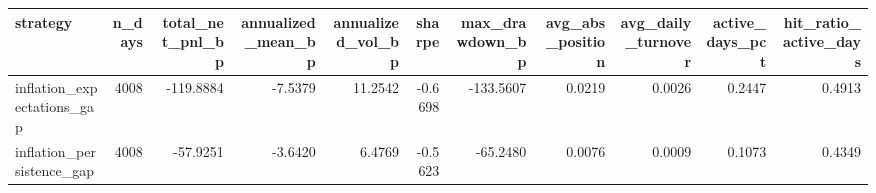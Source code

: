 \begin{tabular}{lrrrrrrrrrr}
\toprule
strategy & n_days & total_net_pnl_bp & annualized_mean_bp & annualized_vol_bp & sharpe & max_drawdown_bp & avg_abs_position & avg_daily_turnover & active_days_pct & hit_ratio_active_days \\
\midrule
inflation_expectations_gap & 4008 & -119.8884 & -7.5379 & 11.2542 & -0.6698 & -133.5607 & 0.0219 & 0.0026 & 0.2447 & 0.4913 \\
inflation_persistence_gap & 4008 & -57.9251 & -3.6420 & 6.4769 & -0.5623 & -65.2480 & 0.0076 & 0.0009 & 0.1073 & 0.4349 \\
\bottomrule
\end{tabular}
